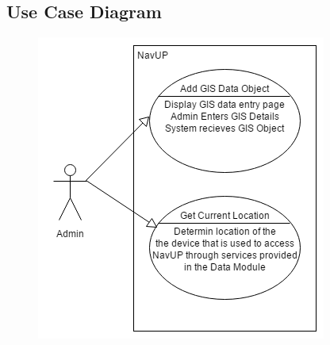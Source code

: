 \subsection{Use Case Diagram}

\begin{figure}[H]
  \includegraphics[width=\textwidth]{GIS/GIS_Use_case.png}
\end{figure}


